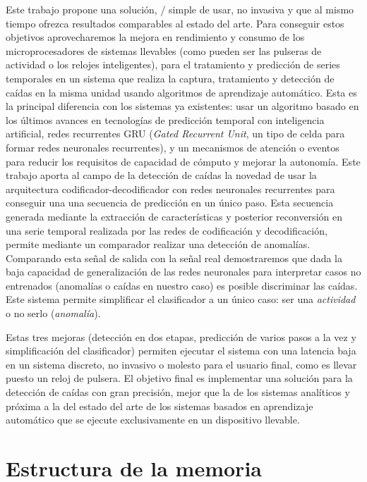 Este trabajo propone una solución, \ifell/ simple de usar, no invasiva y que al mismo tiempo ofrezca resultados comparables al estado del arte. Para conseguir estos objetivos aprovecharemos la mejora en rendimiento y consumo de los microprocesadores de sistemas llevables (como pueden ser las pulseras de actividad o los relojes inteligentes), para el tratamiento y predicción de series temporales en un sistema que realiza la captura, tratamiento y detección de caídas en la misma unidad usando algoritmos de aprendizaje automático. Esta es la principal diferencia con los sistemas ya existentes: usar un algoritmo basado en los últimos avances en tecnologías de predicción temporal con inteligencia artificial, redes recurrentes GRU (\textit{Gated Recurrent Unit}, un tipo de celda para formar redes neuronales recurrentes),  y un mecanismos de atención o eventos para reducir los requisitos de capacidad de cómputo y mejorar la autonomía. Este trabajo aporta al campo de la detección de caídas la novedad de usar la arquitectura codificador-decodificador con redes neuronales recurrentes para conseguir una una secuencia de predicción en un único paso. Esta secuencia generada mediante la extracción de características y posterior reconversión en una serie temporal realizada por las redes de codificación y decodificación, permite mediante un comparador realizar una detección de anomalías. Comparando esta señal de salida con la señal real demostraremos que dada la baja capacidad de generalización de las redes neuronales para interpretar casos no entrenados (anomalías o caídas en nuestro caso) es posible discriminar las caídas. Este sistema permite simplificar el clasificador a un único caso: ser una \textit{actividad} o no serlo (\textit{anomalía}).

Estas tres mejoras (detección en dos etapas, predicción de varios pasos a la vez y simplificación del clasificador) permiten ejecutar el sistema con una latencia baja en un sistema discreto, no invasivo o molesto para el usuario final, como es llevar puesto un reloj de pulsera. El objetivo final es implementar una solución para la detección de caídas con gran precisión, mejor que la de los sistemas analíticos y próxima a la del estado del arte de los sistemas basados en aprendizaje automático que se ejecute exclusivamente en un dispositivo llevable.

\section{Estructura de la memoria}\label{sec:intro:estructura}

